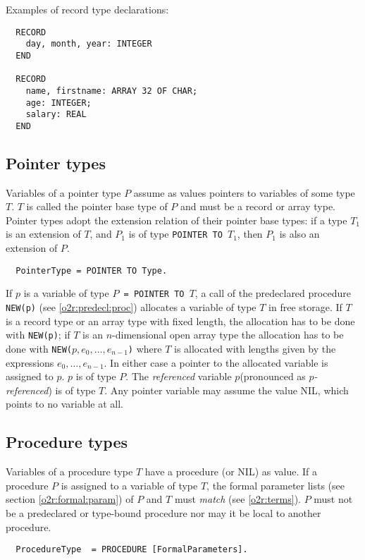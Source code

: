 \noindent
Examples of record type declarations:
\begin{verbatim}
  RECORD
    day, month, year: INTEGER
  END

  RECORD
    name, firstname: ARRAY 32 OF CHAR;
    age: INTEGER;
    salary: REAL
  END
\end{verbatim}

\subsection{Pointer types}\label{o2r:pointer}

Variables of a pointer type $P$ assume as values pointers to variables
of some type $T$. $T$ is called the pointer base type of $P$ and
must be a record or array type. Pointer types adopt the extension
relation of their pointer base types: if a type $T_1$ is an extension
of $T$, and $P_1$ is of type {\tt POINTER TO $T_1$},
then $P_1$ is also an extension of $P$.
{\BNFsize
\begin{verbatim}
  PointerType = POINTER TO Type.
\end{verbatim}}
If $p$ is a variable of type {\tt $P$ = POINTER TO $T$}, a call of the
predeclared procedure {\tt NEW(p)} (see \ref{o2r:predecl:proc})
allocates a variable of type $T$ in free storage. If $T$ is a record type
or an array type with fixed length, the allocation has to be done
with {\tt NEW(p)}; if $T$ is an $n$-dimensional open array type the allocation
has to be done with
{\tt NEW($p,e_0,\ldots,e_{n-1}$)} where $T$ is allocated with
lengths given by the expressions $e_0,\ldots,e_{n-1}$.
In either case a pointer
to the allocated variable is assigned to $p$. $p$ is of type $P$.
The {\em referenced}
variable $p$\arrow (pronounced as {\em $p$-referenced}) is of type $T$.
Any pointer
variable may assume the value NIL, which points to no variable at
all.

\subsection{Procedure types}\label{o2r:proctype}

Variables of a procedure type $T$ have a procedure (or NIL) as value.
If a procedure $P$ is assigned to a variable of type $T$, the formal parameter
lists (see section \ref{o2r:formal:param}) of $P$ and $T$ must
{\em match} (see \ref{o2r:terms}). $P$ must not be a
predeclared or type-bound procedure nor may it be local to another
procedure.
{\BNFsize
\begin{verbatim}
  ProcedureType  = PROCEDURE [FormalParameters].
\end{verbatim}}

